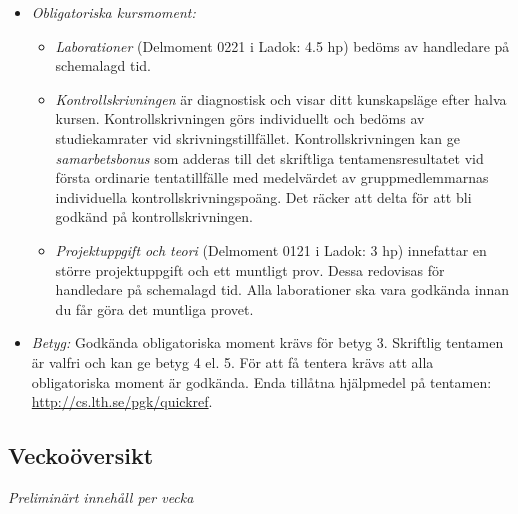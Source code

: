 \documentclass[a4paper,12pt,oneside]{memoir}
\begin{document}
\begin{itemize}
\item
  \emph{Obligatoriska kursmoment:}

  \begin{itemize}
  \item
    \emph{Laborationer} (Delmoment 0221 i Ladok: 4.5 hp) bedöms av handledare på schemalagd tid.
  \item
    \emph{Kontrollskrivningen} är diagnostisk och visar ditt kunskapsläge efter
    halva kursen. Kontrollskrivningen görs individuellt och bedöms
    av studiekamrater vid skrivningstillfället.
    Kontrollskrivningen kan ge \emph{samarbetsbonus} som adderas till
    det skriftliga tentamensresultatet vid första ordinarie
    tentatillfälle med medelvärdet av gruppmedlemmarnas individuella
    kontrollskrivningspoäng. Det räcker att delta för att bli godkänd på kontrollskrivningen.%
  \item
    \emph{Projektuppgift och teori} (Delmoment 0121 i Ladok: 3 hp) innefattar en större projektuppgift och ett muntligt prov. Dessa redovisas för handledare på
    schemalagd tid. Alla laborationer ska vara godkända innan du får göra det muntliga provet.
  \end{itemize}

\item \emph{Betyg:} 
  Godkända obligatoriska moment krävs för betyg 3. Skriftlig tentamen är valfri och kan ge betyg 4 el. 5. 
  För att få tentera krävs att alla obligatoriska moment är godkända. Enda tillåtna hjälpmedel på tentamen:
  \href{http://cs.lth.se/pgk/quickref}{\url{http://cs.lth.se/pgk/quickref}}. \\
\end{itemize}

\clearpage

\subsection*{Veckoöversikt}

\resizebox{\columnwidth}{!}{%
{\fontsize{12pt}{20pt}\selectfont

}
}

\vspace{1.1em}\noindent\hspace*{-2.0mm}%
\noindent\textit{Preliminärt innehåll per vecka}\\~\\
\noindent\resizebox{\columnwidth}{!}
{%
{
\fontsize{5.0pt}{6.0pt}\selectfont
\begin{tabular}{l|l|p{7.4cm}}

\end{tabular}
}
}
\end{document}
